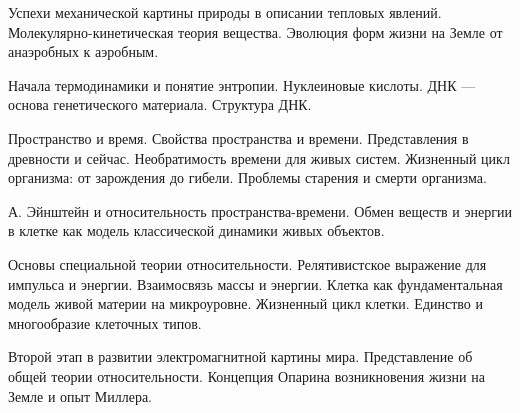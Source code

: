 \documentclass[
	14pt,
	a4paper,
	]
	{scrartcl}
\begin{document}
\shapk
{}
\setcounter{zad}{0}

\vfill
\z Успехи механической картины природы в описании тепловых явлений. Молекулярно-кинетическая теория вещества.
 \vfill
\z Эволюция форм жизни на Земле от анаэробных к аэробным.
 \vfill

\vfill

\newpage


\shapk
{}
\setcounter{zad}{0}

\vfill
\z Начала термодинамики и понятие энтропии.
 \vfill
\z Нуклеиновые кислоты. ДНК --- основа генетического материала. Структура ДНК.
 \vfill

\vfill

\newpage


\shapk
{}
\setcounter{zad}{0}

\vfill
\z Пространство и время. Свойства пространства и времени. Представления в древности и сейчас.
 \vfill
\z Необратимость времени для живых систем. Жизненный цикл организма: от зарождения до гибели. Проблемы старения и смерти организма.
 \vfill

\vfill

\newpage


\shapk
{}
\setcounter{zad}{0}

\vfill
\z А. Эйнштейн и относительность пространства-времени.
 \vfill
\z Обмен веществ и энергии в клетке как модель классической динамики живых объектов.
 \vfill

\vfill

\newpage


\shapk
{}
\setcounter{zad}{0}

\vfill
\z Основы специальной теории относительности. Релятивистское выражение для импульса и энергии. Взаимосвязь массы и энергии.
 \vfill
\z Клетка как фундаментальная модель живой материи на микроуровне. Жизненный цикл клетки. Единство и многообразие клеточных типов.
 \vfill

\vfill

\newpage


\shapk
{}
\setcounter{zad}{0}

\vfill
\z Второй этап в развитии электромагнитной картины мира. Представление об общей теории относительности.
 \vfill
\z Концепция Опарина возникновения жизни на Земле и опыт Миллера.
 \vfill

\vfill

\newpage
\end{document}
